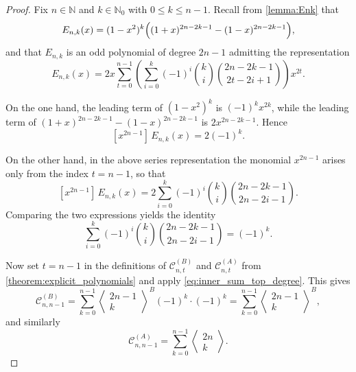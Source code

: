 \documentclass[11pt,twoside]{article}
\numberwithin{equation}{section}
\begin{document}
\begin{proof}
Fix $n\in\mathbb{N}$ and $k\in\mathbb{N}_0$ with $0\le k\le n-1$.
Recall from \cref{lemma:Enk} that
\[
E_{n,k}(x)=(1-x^2)^k\Bigl((1+x)^{2n-2k-1}-(1-x)^{2n-2k-1}\Bigr),
\]
and that $E_{n,k}$ is an odd polynomial of degree $2n-1$ admitting the representation
\[
E_{n,k}(x)
=
2x\sum_{t=0}^{n-1}\left(\sum_{i=0}^{k}(-1)^i\binom{k}{i}\binom{2n-2k-1}{2t-2i+1}\right)x^{2t}.
\]

On the one hand, the leading term of $(1-x^2)^k$ is $(-1)^k x^{2k}$, while the leading term of
$(1+x)^{2n-2k-1}-(1-x)^{2n-2k-1}$ is $2x^{2n-2k-1}$. Hence
\[
[x^{2n-1}]\,E_{n,k}(x)=2(-1)^k.
\]

On the other hand, in the above series representation the monomial $x^{2n-1}$ arises only from the index
$t=n-1$, so that
\[
[x^{2n-1}]\,E_{n,k}(x)
=
2\sum_{i=0}^{k}(-1)^i\binom{k}{i}\binom{2n-2k-1}{2n-2i-1}.
\]
Comparing the two expressions yields the identity
\begin{equation}\label{eq:inner_sum_top_degree}
\sum_{i=0}^{k}(-1)^i\binom{k}{i}\binom{2n-2k-1}{2n-2i-1}=(-1)^k.
\end{equation}

Now set $t=n-1$ in the definitions of $\mathcal{C}^{(B)}_{n,t}$ and $\mathcal{C}^{(A)}_{n,t}$ from
\cref{theorem:explicit_polynomials} and apply \eqref{eq:inner_sum_top_degree}. This gives
\[
\mathcal{C}^{(B)}_{n,n-1}
=
\sum_{k=0}^{n-1}\left\langle\begin{matrix}2n-1\\ k\end{matrix}\right\rangle^{B}
(-1)^k\cdot(-1)^k
=
\sum_{k=0}^{n-1}\left\langle\begin{matrix}2n-1\\ k\end{matrix}\right\rangle^{B},
\]
and similarly
\[
\mathcal{C}^{(A)}_{n,n-1}
=
\sum_{k=0}^{n-1}\left\langle\begin{matrix}2n\\ k\end{matrix}\right\rangle.
\]


\end{proof}
\end{document}
